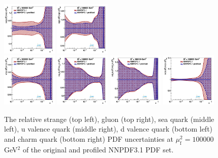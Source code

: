 \documentclass[pdftex,twocolumn,epjc3]{svjour3}          %
\newcommand{\nnpdf} {NNPDF3.1\xspace}
\begin{document}
\begin{figure}
    \centering
    {{\includegraphics[width=0.235\textwidth]{pics/pdf-profile-fonll/q2_100000_pdf_s_ratio.pdf}}}
    {{\includegraphics[width=0.235\textwidth]{pics/pdf-profile-fonll/q2_100000_pdf_g_ratio.pdf}}}\\
    {{\includegraphics[width=0.235\textwidth]{pics/pdf-profile-fonll/q2_100000_pdf_Sea_ratio.pdf}}}
    {{\includegraphics[width=0.235\textwidth]{pics/pdf-profile-fonll/q2_100000_pdf_uv_ratio.pdf}}}
    {{\includegraphics[width=0.235\textwidth]{pics/pdf-profile-fonll/q2_100000_pdf_dv_ratio.pdf}}}
    {{\includegraphics[width=0.235\textwidth]{pics/pdf-profile-fonll/q2_100000_pdf_c_ratio.pdf}}}
    \caption{The relative strange (top left), gluon (top right), sea quark (middle left), u valence quark (middle right), d valence quark (bottom left) and charm quark (bottom right) PDF uncertainties at $\mu_\mathrm{f}^2=100000$ GeV$^2$ of the original and profiled \nnpdf PDF set.}
    \label{fig:pdf-nnpdf-100000}
\end{figure}
\end{document}
